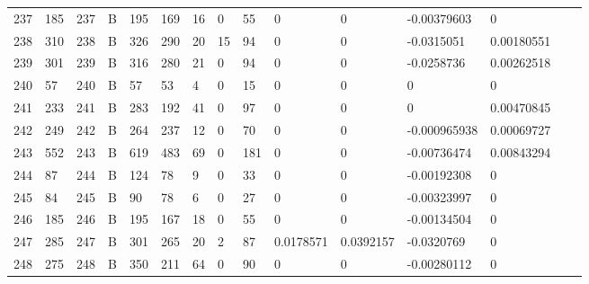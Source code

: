 \begin{longtable}{lllllllllllllll}
	237 & 185               & 237 & B   & 195               & 169               & 16                & 0    & 55         & 0              & 0              & -0.00379603   & 0            \\
	238 & 310               & 238 & B   & 326               & 290               & 20                & 15   & 94         & 0              & 0              & -0.0315051    & 0.00180551   \\
	239 & 301               & 239 & B   & 316               & 280               & 21                & 0    & 94         & 0              & 0              & -0.0258736    & 0.00262518   \\
	240 & 57                & 240 & B   & 57                & 53                & 4                 & 0    & 15         & 0              & 0              & 0             & 0            \\
	241 & 233               & 241 & B   & 283               & 192               & 41                & 0    & 97         & 0              & 0              & 0             & 0.00470845   \\
	242 & 249               & 242 & B   & 264               & 237               & 12                & 0    & 70         & 0              & 0              & -0.000965938  & 0.00069727   \\
	243 & 552               & 243 & B   & 619               & 483               & 69                & 0    & 181        & 0              & 0              & -0.00736474   & 0.00843294   \\
	244 & 87                & 244 & B   & 124               & 78                & 9                 & 0    & 33         & 0              & 0              & -0.00192308   & 0            \\
	245 & 84                & 245 & B   & 90                & 78                & 6                 & 0    & 27         & 0              & 0              & -0.00323997   & 0            \\
	246 & 185               & 246 & B   & 195               & 167               & 18                & 0    & 55         & 0              & 0              & -0.00134504   & 0            \\
	247 & 285               & 247 & B   & 301               & 265               & 20                & 2    & 87         & 0.0178571      & 0.0392157      & -0.0320769    & 0            \\
	248 & 275               & 248 & B   & 350               & 211               & 64                & 0    & 90         & 0              & 0              & -0.00280112   & 0            \\

\end{longtable}
